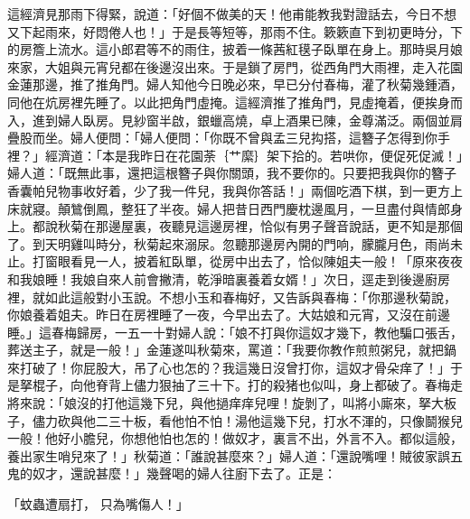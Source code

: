\begin{showcontents}{}
這經濟見那雨下得緊，說道：「好個不做美的天！他甫能教我對證話去，今日不想又下起雨來，好悶倦人也！」于是長等短等，那雨不住。簌簌直下到初更時分，下的房簷上流水。這小郎君等不的雨住，披着一條茜紅氁子臥單在身上。那時吳月娘來家，大姐與元宵兒都在後邊沒出來。于是鎖了房門，從西角門大雨裡，走入花園金蓮那邊，推了推角門。婦人知他今日晚必來，早已分付春梅，灌了秋菊幾鍾酒，同他在炕房裡先睡了。以此把角門虛掩。這經濟推了推角門，見虛掩着，便挨身而入，進到婦人臥房。見紗窗半啟，銀蠟高燒，卓上酒果已陳，金尊滿泛。兩個並肩疊股而坐。婦人便問：「婦人便問：「你既不曾與孟三兒抅搭，這簪子怎得到你手裡？」經濟道：「本是我昨日在花園荼｛艹縻｝架下拾的。若哄你，便促死促滅！」婦人道：「既無此事，還把這根簪子與你關頭，我不要你的。只要把我與你的簪子香囊帕兒物事收好着，少了我一件兒，我與你答話！」兩個吃酒下棋，到一更方上床就寢。顛鷥倒鳳，整狂了半夜。婦人把昔日西門慶枕邊風月，一旦盡付與情郎身上。都說秋菊在那邊屋裏，夜聽見這邊房裡，恰似有男子聲音說話，更不知是那個了。到天明雞叫時分，秋菊起來溺尿。忽聽那邊房內開的門响，朦朧月色，雨尚未止。打窗眼看見一人，披着紅臥單，從房中出去了，恰似陳姐夫一般！「原來夜夜和我娘睡！我娘自來人前會撇清，乾淨暗裏養着女婿！」次日，逕走到後邊廚房裡，就如此這般對小玉說。不想小玉和春梅好，又告訴與春梅：「你那邊秋菊說，你娘養着姐夫。昨日在房裡睡了一夜，今早出去了。大姑娘和元宵，又沒在前邊睡。」這春梅歸房，一五一十對婦人說：「娘不打與你這奴才幾下，教他騙口張舌，葬送主子，就是一般！」金蓮遂叫秋菊來，罵道：「我要你教作煎煎粥兒，就把鍋來打破了！你屁股大，吊了心也怎的？我這幾日沒曾打你，這奴才骨朵痒了！」于是拏棍子，向他脊背上儘力狠抽了三十下。打的殺猪也似叫，身上都破了。春梅走將來說：「娘沒的打他這幾下兒，與他撾痒痒兒哩！旋剝了，叫將小廝來，拏大板子，儘力砍與他二三十板，看他怕不怕！湯他這幾下兒，打水不渾的，只像鬬猴兒一般！他好小膽兒，你想他怕也怎的！做奴才，裏言不出，外言不入。都似這般，養出家生哨兒來了！」秋菊道：「誰說甚麼來？」婦人道：「還說嘴哩！賊彼家誤五鬼的奴才，還說甚麼！」幾聲喝的婦人往廚下去了。正是：

「蚊蟲遭扇打，  只為嘴傷人！」


\end{showcontents}
